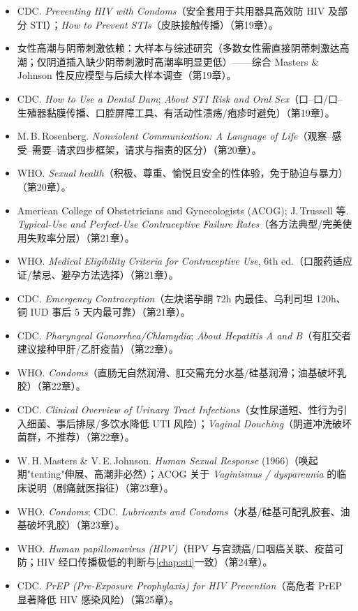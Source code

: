 \documentclass[12pt,UTF8,openany]{ctexbook}
\begin{document}
\begin{itemize}[leftmargin=2em]
  \item CDC. \emph{Preventing HIV with Condoms}（安全套用于共用器具高效防 HIV 及部分 STI）；\emph{How to Prevent STIs}（皮肤接触传播）（第19章）。
  \item 女性高潮与阴蒂刺激依赖：大样本与综述研究（多数女性需直接阴蒂刺激达高潮；仅阴道插入缺少阴蒂刺激时高潮率明显更低）——综合 Masters \& Johnson 性反应模型与后续大样本调查（第19章）。
  \item CDC. \emph{How to Use a Dental Dam}; \emph{About STI Risk and Oral Sex}（口--口/口--生殖器黏膜传播、口腔屏障工具、有活动性溃疡/疱疹时避免）（第19章）。
  \item M.\,B.\,Rosenberg. \emph{Nonviolent Communication: A Language of Life}（观察--感受--需要--请求四步框架，请求与指责的区分）（第20章）。
  \item WHO. \emph{Sexual health}（积极、尊重、愉悦且安全的性体验，免于胁迫与暴力）（第20章）。
  \item American College of Obstetricians and Gynecologists (ACOG); J.\,Trussell 等. \emph{Typical-Use and Perfect-Use Contraceptive Failure Rates}（各方法典型/完美使用失败率分层）（第21章）。
  \item WHO. \emph{Medical Eligibility Criteria for Contraceptive Use}, 6th ed.（口服药适应证/禁忌、避孕方法选择）（第21章）。
  \item CDC. \emph{Emergency Contraception}（左炔诺孕酮 72h 内最佳、乌利司坦 120h、铜 IUD 事后 5 天内最可靠）（第21章）。
  \item CDC. \emph{Pharyngeal Gonorrhea/Chlamydia}; \emph{About Hepatitis A and B}（有肛交者建议接种甲肝/乙肝疫苗）（第22章）。
  \item WHO. \emph{Condoms}（直肠无自然润滑、肛交需充分水基/硅基润滑；油基破坏乳胶）（第22章）。
  \item CDC. \emph{Clinical Overview of Urinary Tract Infections}（女性尿道短、性行为引入细菌、事后排尿/多饮水降低 UTI 风险）；\emph{Vaginal Douching}（阴道冲洗破坏菌群，不推荐）（第22章）。
  \item W.\,H.\,Masters \& V.\,E.\,Johnson. \emph{Human Sexual Response} (1966)（唤起期"tenting"伸展、高潮非必然）；ACOG 关于 \emph{Vaginismus / dyspareunia} 的临床说明（剧痛就医指征）（第23章）。
  \item WHO. \emph{Condoms}; CDC. \emph{Lubricants and Condoms}（水基/硅基可配乳胶套、油基破坏乳胶）（第23章）。
  \item WHO. \emph{Human papillomavirus (HPV)}（HPV 与宫颈癌/口咽癌关联、疫苗可防；HIV 经口传播极低的判断与\ref{chap:sti}一致）（第24章）。
  \item CDC. \emph{PrEP (Pre-Exposure Prophylaxis) for HIV Prevention}（高危者 PrEP 显著降低 HIV 感染风险）（第25章）。

\end{itemize}
\end{document}

